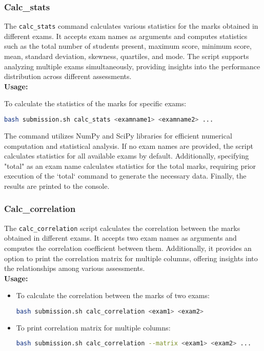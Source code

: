 \documentclass{article}
\begin{document}
\subsubsection{Calc\_stats}
The \texttt{calc\_stats} command calculates various statistics for the marks obtained in different exams. It accepts exam names as arguments and computes statistics such as the total number of students present, maximum score, minimum score, mean, standard deviation, skewness, quartiles, and mode. The script supports analyzing multiple exams simultaneously, providing insights into the performance distribution across different assessments.\\
\textbf{Usage:}
\begin{adjustwidth}{0.5cm}{0cm}
To calculate the statistics of the marks for specific exams:
\begin{lstlisting}[language=bash]
bash submission.sh calc_stats <examname1> <examname2> ...
\end{lstlisting}
\end{adjustwidth}

The command utilizes NumPy and SciPy libraries for efficient numerical computation and statistical analysis. If no exam names are provided, the script calculates statistics for all available exams by default. Additionally, specifying "total" as an exam name calculates statistics for the total marks, requiring prior execution of the `total` command to generate the necessary data.  Finally, the results are printed to the console.

\subsubsection{Calc\_correlation}
The \texttt{calc\_correlation} script calculates the correlation between the marks obtained in different exams. It accepts two exam names as arguments and computes the correlation coefficient between them. Additionally, it provides an option to print the correlation matrix for multiple columns, offering insights into the relationships among various assessments.\\
\textbf{Usage:}
\begin{itemize}
    \item To calculate the correlation between the marks of two exams:
    \begin{lstlisting}[language=bash]
    bash submission.sh calc_correlation <exam1> <exam2>
    \end{lstlisting}
    \item To print correlation matrix for multiple columns:
    \begin{lstlisting}[language=bash]
    bash submission.sh calc_correlation --matrix <exam1> <exam2> ...
    \end{lstlisting}
\end{itemize}
\end{document}
